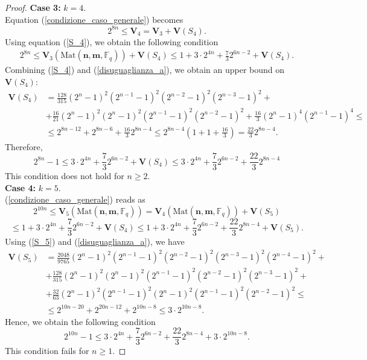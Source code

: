 \documentclass[10pt,a4paper]{amsart}
\begin{document}
\begin{proof}
\textbf{Case 3:} $k=4$.\\
Equation (\ref{condizione_caso_generale}) becomes
\[
2^{8n}\leq\textbf{V}_4=\textbf{V}_3+\textbf{V}(S_4).
\]
Using equation (\ref{S_4}), we obtain the following condition
\[
\begin{aligned}
2^{8n}\leq \mathbf{V}_3(\text{Mat}(\textbf{n},\textbf{m},\mathbb{F}_q))+\mathbf{V}(S_4)\leq1+ 3\cdot2^{4n}+\frac{7}{3}2^{6n-2}+\mathbf{V}(S_4).
\end{aligned}
\]
Combining (\ref{S_4}) and (\ref{disuguaglianza_a}), we obtain an upper bound on $\mathbf{V}(S_4)$:
\[
\begin{aligned}
\mathbf{V}(S_4)&=\frac{128}{315}(2^n-1)^2(2^{n-1}-1)^2(2^{n-2}-1)^2(2^{n-3}-1)^2+\\&+\frac{16}{21}(2^n-1)^2(2^n-1)^2(2^{n-1}-1)^2(2^{n-2}-1)^2+\frac{16}{3}(2^n-1)^4(2^{n-1}-1)^4\leq\\&\leq2^{8n-12}+2^{8n-6}+\frac{16}{3}2^{8n-4}\leq2^{8n-4}\left(1+1+\frac{16}{3}\right)=\frac{22}{3}2^{8n-4}.
\end{aligned}
\]
Therefore,
\[
2^{8n}-1\leq3\cdot2^{4n}+\frac{7}{3}2^{6n-2}+\textbf{V}(S_4)\leq 3\cdot2^{4n}+\frac{7}{3}2^{6n-2}+\frac{22}{3}2^{8n-4}
\]
This condition does not hold for $n\geq2$.\\

\textbf{Case 4:} $k=5$.\\
(\ref{condizione_caso_generale}) reads as
\[
2^{10n}\leq\mathbf{V}_5(\text{Mat}(\textbf{n},\textbf{m},\mathbb{F}_q))=\mathbf{V}_4(\text{Mat}(\textbf{n},\textbf{m},\mathbb{F}_q))+\mathbf{V}(S_5)\]\[\leq1+ 3\cdot2^{4n}+\frac{7}{3}2^{6n-2}+\mathbf{V}(S_4)\leq1+ 3\cdot2^{4n}+\frac{7}{3}2^{6n-2}+\frac{22}{3}2^{8n-4}+\mathbf{V}(S_5).
\]
Using (\ref{S_5}) and (\ref{disuguaglianza_a}), we have
\[
\begin{aligned}
\mathbf{V}(S_5)&=\frac{2048}{9765}(2^n-1)^2(2^{n-1}-1)^2(2^{n-2}-1)^2(2^{n-3}-1)^2(2^{n-4}-1)^2+\\&+\frac{128}{315}(2^n-1)^2(2^n-1)^2(2^{n-1}-1)^2(2^{n-2}-1)^2(2^{n-3}-1)^2+\\&+\frac{32}{63}(2^n-1)^2(2^{n-1}-1)^2(2^n-1)^2(2^{n-1}-1)^2(2^{n-2}-1)^2\leq\\&\leq2^{10n-20}+2^{20n-12}+2^{10n-8}\leq3\cdot2^{10n-8}.
\end{aligned}
\]
Hence, we obtain the following condition 
\[
2^{10n}-1\leq3\cdot2^{4n}+\frac{7}{3}2^{6n-2}+\frac{22}{3}2^{8n-4}+3\cdot2^{10n-8}.
\]
This condition fails for $n\geq1$.
\end{proof}
\end{document}

